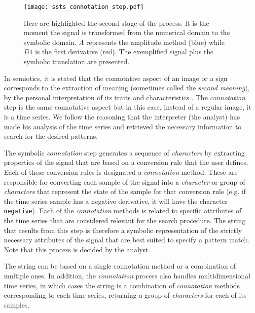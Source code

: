 \begin{figure}
\centering
\texttt{[image: ssts\_connotation\_step.pdf]}
\caption{Here are highlighted the second stage of the process. It is the moment the signal is transformed from the numerical domain to the symbolic domain. $A$ represents the amplitude method (blue) while $D1$ is the first derivative (red). The exemplified signal plus the symbolic translation are presented.}
\label{fig:ssts_connotation}
\end{figure}

In semiotics, it is stated that the connotative aspect of an image or a sign corresponds to the extraction of meaning (sometimes called the \textit{second meaning}), by the personal interpretation of its traits and characteristics \cite{connotation}. The \textit{connotation} step is the same connotative aspect but in this case, instead of a regular image, it is a time series. We follow the reasoning that the interpreter (the analyst) has made his analysis of the time series and retrieved the necessary information to search for the desired patterns. 
\par
The symbolic \textit{connotation} step generates a sequence of \textit{characters} by extracting properties of the signal that are based on a conversion rule that the user defines. Each of these conversion rules is designated a \textit{connotation} method. These are responsible for converting each sample of the signal into a \textit{character} or group of \textit{characters} that represent the state of the sample for that conversion rule (e.g. if the time series sample has a negative derivative, it will have the character \texttt{negative}). Each of the \textit{connotation} methods is related to specific attributes of the time series that are considered relevant for the search procedure. The string that results from this step is therefore a symbolic representation of the strictly necessary attributes of the signal that are best suited to specify a pattern match. Note that this process is decided by the analyst.
\par
The string can be based on a single connotation method or a combination of multiple ones. In addition, the \textit{connotation} process also handles multidimensional time series, in which cases the string is a combination of \textit{connotation} methods corresponding to each time series, returning a group of \textit{characters} for each of its samples.
\par
